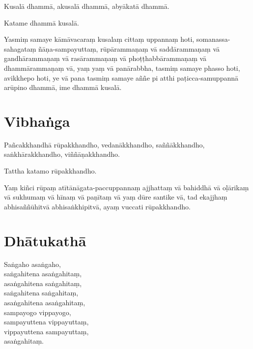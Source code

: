 Kusalā dhammā, akusalā dhammā, abyākatā dhammā.

Katame dhammā kusalā.

Yasmiṃ samaye kāmāvacaraṃ kusalaṃ cittaṃ uppannaṃ hoti, somanassa-sahagataṃ
ñāṇa-sampayuttaṃ, rūpārammaṇaṃ vā saddārammaṇaṃ vā gandhārammaṇaṃ vā
rasārammaṇaṃ vā phoṭṭhabbārammaṇaṃ vā dhammārammaṇaṃ vā, yaṃ yaṃ vā panārabbha,
tasmiṃ samaye phasso hoti, avikkhepo hoti, ye vā pana tasmiṃ samaye aññe pi atthi paṭicca-samuppannā arūpino dhammā, ime dhammā kusalā.



\section{Vibhaṅga}

Pañcakkhandhā rūpakkhandho, vedanākkhandho, saññākkhandho, saṅkhārakkhandho,
viññāṇakkhandho.

Tattha katamo rūpakkhandho.

Yaṃ kiñci rūpaṃ atītānāgata-paccuppannaṃ ajjhattaṃ vā bahiddhā vā oḷārikaṃ vā
sukhumaṃ vā hīnaṃ vā paṇītaṃ vā yaṃ dūre santike vā, tad ekajjhaṃ
abhisaññūhitvā abhisaṅkhipitvā, ayaṃ vuccati rūpakkhandho.



\section{Dhātukathā}

Saṅgaho asaṅgaho,\\
saṅgahitena asaṅgahitaṃ,\\
asaṅgahitena saṅgahitaṃ,\\
saṅgahitena saṅgahitaṃ,\\
asaṅgahitena asaṅgahitaṃ,\\
sampayogo vippayogo,\\
sampayuttena vippayuttaṃ,\\
vippayuttena sampayuttaṃ,\\
asaṅgahitaṃ.



